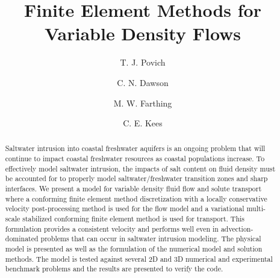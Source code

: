 \documentclass[letterpaper]{erdc}
\begin{document}
\frontmatter




\title{Finite Element Methods for Variable Density Flows}

\author{T. J. Povich}


\author{C. N. Dawson}


\author{M. W. Farthing \and C. E. Kees}


%
%




\begin{abstract}
 Saltwater intrusion into coastal freshwater aquifers is an ongoing problem that will continue to impact coastal freshwater resources as coastal populations increase.   To effectively model saltwater intrusion, the impacts of  salt content on fluid density must be accounted for to properly model saltwater/freshwater transition zones and sharp interfaces.  We present a model for variable density fluid flow and solute transport where a conforming finite element method discretization with a locally conservative velocity post-processing method is used for the flow model and a variational multi-scale stabilized conforming finite element method is used for transport.   This formulation provides a consistent velocity and performs well even in advection-dominated problems that can occur in saltwater intrusion modeling. The physical model is presented as well as the formulation of the numerical model and solution methods. The model is tested against several 2D and 3D numerical and experimental benchmark problems and the results are presented to verify the code. 
\end{abstract}
\end{document}
